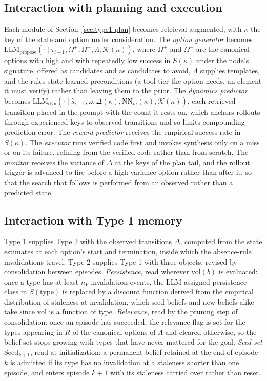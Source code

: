 \documentclass[10pt]{article}
\newcommand{\llm}[1]{\mathrm{LLM}_{\mathrm{#1}}}
\newcommand{\calK}{\mathcal{K}}
\newcommand{\Rel}{R}
\newcommand{\shat}{\hat{s}}
\newcommand{\vol}{\mathrm{vol}}
\newcommand{\type}{\mathrm{type}}
\begin{document}
\subsection{Interaction with planning and execution}
\label{sec:type2-interaction}

Each module of Section~\ref{sec:type1-plan} becomes retrieval-augmented, with $\kappa$ the key of the state and option under consideration. The \emph{option generator} becomes $\llm{propose}(\cdot\mid\tau_{i-1},\Omega^{+},\Omega^{-},\Lambda,\calK(\kappa))$, where $\Omega^{+}$ and $\Omega^{-}$ are the canonical options with high and with repeatedly low success in $S(\kappa)$ under the node's signature, offered as candidates and as candidates to avoid, $\Lambda$ supplies templates, and the rules state learned preconditions (a tool tier the option needs, an element it must verify) rather than leaving them to the prior. The \emph{dynamics predictor} becomes $\llm{dyn}(\cdot\mid\shat_{i-1},\omega,\bar\Delta(\kappa),\mathrm{NN}_m(\kappa),\calK(\kappa))$, each retrieved transition placed in the prompt with the count it rests on, which anchors rollouts through experienced keys to observed transitions and so limits compounding prediction error. The \emph{reward predictor} receives the empirical success rate in $S(\kappa)$. The \emph{executor} runs verified code first and invokes synthesis only on a miss or on its failure, refining from the verified code rather than from scratch. The \emph{monitor} receives the variance of $\Delta$ at the keys of the plan tail, and the rollout trigger is advanced to fire before a high-variance option rather than after it, so that the search that follows is performed from an observed rather than a predicted state.

\subsection{Interaction with Type 1 memory}
\label{sec:type1-type2}

Type 1 supplies Type 2 with the observed transitions $\Delta$, computed from the state estimates at each option's start and termination, inside which the absence-rule invalidations travel. Type 2 supplies Type 1 with three objects, revised by consolidation between episodes. \emph{Persistence}, read wherever $\vol(b)$ is evaluated: once a type has at least $n_V$ invalidation events, the LLM-assigned persistence class in $S(\type)$ is replaced by a discount function derived from the empirical distribution of staleness at invalidation, which seed beliefs and new beliefs alike take since $\vol$ is a function of type. \emph{Relevance}, read by the pruning step of consolidation: once an episode has succeeded, the relevance flag is set for the types appearing in $\Rel$ of the canonical options of $\Lambda$ and cleared otherwise, so the belief set stops growing with types that have never mattered for the goal. \emph{Seed set} $\mathrm{Seed}_{k+1}$, read at initialization: a permanent belief retained at the end of episode $k$ is admitted if its type has no invalidation at a staleness shorter than one episode, and enters episode $k+1$ with its staleness carried over rather than reset.
\end{document}
